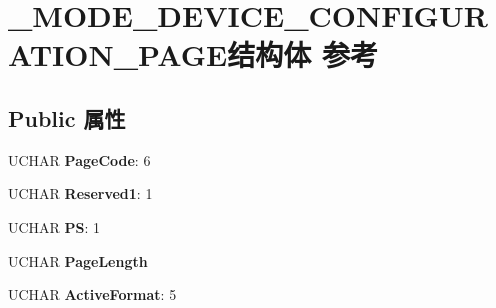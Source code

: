 \hypertarget{struct___m_o_d_e___d_e_v_i_c_e___c_o_n_f_i_g_u_r_a_t_i_o_n___p_a_g_e}{}\section{\+\_\+\+M\+O\+D\+E\+\_\+\+D\+E\+V\+I\+C\+E\+\_\+\+C\+O\+N\+F\+I\+G\+U\+R\+A\+T\+I\+O\+N\+\_\+\+P\+A\+G\+E结构体 参考}
\label{struct___m_o_d_e___d_e_v_i_c_e___c_o_n_f_i_g_u_r_a_t_i_o_n___p_a_g_e}
\subsection*{Public 属性}
\begin{DoxyCompactItemize}
\item 
\mbox{\label{struct___m_o_d_e___d_e_v_i_c_e___c_o_n_f_i_g_u_r_a_t_i_o_n___p_a_g_e_a3598cbb986331b9fc2522337006d535d}} 
U\+C\+H\+AR {\bfseries Page\+Code}\+: 6
\item 
\mbox{\label{struct___m_o_d_e___d_e_v_i_c_e___c_o_n_f_i_g_u_r_a_t_i_o_n___p_a_g_e_acd1cabfb9a595c94a5abff2dd0324e1a}} 
U\+C\+H\+AR {\bfseries Reserved1}\+: 1
\item 
\mbox{\label{struct___m_o_d_e___d_e_v_i_c_e___c_o_n_f_i_g_u_r_a_t_i_o_n___p_a_g_e_af238abf84a5ebc042201137d79347526}} 
U\+C\+H\+AR {\bfseries PS}\+: 1
\item 
\mbox{\label{struct___m_o_d_e___d_e_v_i_c_e___c_o_n_f_i_g_u_r_a_t_i_o_n___p_a_g_e_a4270ce26553899d73b5e0ce614d38c50}} 
U\+C\+H\+AR {\bfseries Page\+Length}
\item 
\mbox{\label{struct___m_o_d_e___d_e_v_i_c_e___c_o_n_f_i_g_u_r_a_t_i_o_n___p_a_g_e_a194a29f4ad1ab3aeac3950059f90101c}} 
U\+C\+H\+AR {\bfseries Active\+Format}\+: 5
\item 
\mbox{\label{struct___m_o_d_e___d_e_v_i_c_e___c_o_n_f_i_g_u_r_a_t_i_o_n___p_a_g_e_aac2fad041f1f4ce9ca084e167182d144}} 

\end{DoxyCompactItemize}
